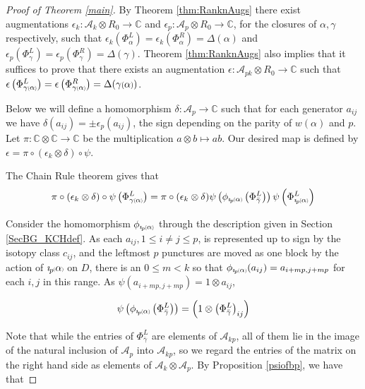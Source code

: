 \documentclass[11pt]{amsart}
\def\C{{\mathbb C}}
\def\A{{\mathcal A}}
\newcommand*{\smallp}[1]{\scalebox{.75}{\ensuremath#1}}
\newcommand*{\subsmallp}[1]{\scalebox{.5}{\ensuremath#1}}
\newcommand{\subpp}[2][p]{\imath_{\hspace*{-1pt}#1}\hspace*{-.5pt}\subsmallp(#2\subsmallp)}
\theoremstyle{definition}
\begin{document}
\begin{proof}[Proof of Theorem \ref{main}]
By Theorem \ref{thm:RanknAugs} there exist augmentations $\epsilon_k\colon \A_k\otimes R_0 \rightarrow \C$ and $\epsilon_p\colon \A_p\otimes R_0 \rightarrow \C$, for the closures of $\alpha,\gamma$ respectively, such that $\epsilon_k\left(\Phi_\alpha^L\right) = \epsilon_k\left(\Phi_\alpha^R\right) = \Delta(\alpha)$ and $\epsilon_p\left(\Phi_{\gamma}^L\right) = \epsilon_p\left(\Phi_{\gamma}^R\right) = \Delta(\gamma)$. Theorem \ref{thm:RanknAugs} also implies that it suffices to prove that there exists an augmentation $\epsilon\colon \A_{pk}\otimes R_0\rightarrow \C$ such that $\epsilon\left(\Phi_{\gamma\subsmallp(\alpha\subsmallp)}^L\right) = \epsilon\left(\Phi_{\gamma\subsmallp(\alpha\subsmallp)}^R\right) = \Delta(\gamma\smallp(\alpha\smallp))$.


Below we will define a homomorphism $\delta\colon\A_p\rightarrow \C$ such that for each generator $a_{ij}$ we have $\delta(a_{ij}) = \pm \epsilon_p(a_{ij})$, the sign depending on the parity of $w(\alpha)$ and $p$. Let $\pi\colon \C\otimes \C \rightarrow \C$ be the multiplication $a\otimes b\mapsto ab$. Our desired map is defined by $\epsilon = \pi\circ(\epsilon_k\otimes\delta)\circ\psi$.


The Chain Rule theorem gives that
\begin{equation}
\pi\circ(\epsilon_k\otimes\delta)\circ\psi\left(\Phi_{\gamma\subsmallp(\alpha\subsmallp)}^L\right) = \pi\circ(\epsilon_k\otimes\delta)\psi\left(\phi_{\subpp\alpha}\left(\Phi_{\bar\gamma}^L\right)\right)\psi\left(\Phi_{\subpp\alpha}^L\right)
\label{eqn1MainPf}
\end{equation}

Consider the homomorphism $\phi_{\subpp\alpha}$ through the description  given in Section \ref{SecBG_KCHdef}. As each $a_{ij}, 1\le i\ne j\le p$, is represented up to sign by the isotopy class $c_{ij}$, and the leftmost $p$ punctures are moved as one block by the action of $\subpp\alpha$ on $D$, there is an $0\le m<k$ so that $\phi_{\subpp\alpha}(a_{ij})=a_{i+mp,j+mp}$ for each $i,j$ in this range. As $\psi(a_{i + mp, j+mp})=1\otimes a_{ij}$,

$$\psi\left(\phi_{\subpp\alpha}\left(\Phi_{\bar\gamma}^L\right)\right) = \left(1\otimes \left(\Phi_{\bar\gamma}^L\right)_{ij}\right)$$

Note that while the entries of $\Phi_{\bar\gamma}^L$ are elements of $\A_{kp}$, all of them lie in the image of the natural inclusion of $\A_p$ into $\A_{kp}$, so we regard the entries of the matrix on the right hand side as elements of $\A_k\otimes \A_p$.  By Proposition \ref{psiofbp}, we have that 


\end{proof}
\end{document}
